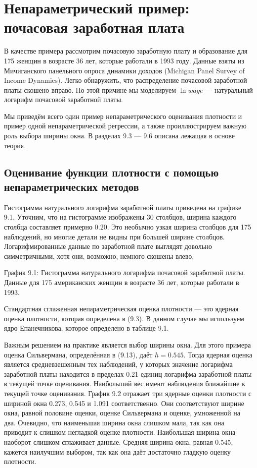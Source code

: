 \section{Непараметрический пример: почасовая заработная плата}

В качестве примера рассмотрим почасовую заработную плату и образование для 175 женщин в возрасте 36 лет, которые работали в 1993 году. Данные взяты из Мичиганского панельного опроса динамики доходов (Michigan Panel Survey of Income Dynamics). Легко обнаружить, что распределение почасовой заработной платы скошено вправо. По этой причине мы моделируем $\ln wage$ --- натуральный логарифм почасовой заработной платы.

Мы приведём всего один пример непараметрического оценивания плотности и пример одной непараметрической регрессии, а также проиллюстрируем важную роль выбора ширины окна. В разделах 9.3 --- 9.6 описана лежащая в основе теория.

\subsection{Оценивание функции плотности с помощью непараметрических методов}

Гистограмма натурального логарифма заработной платы приведена на графике 9.1. Уточним, что на гистограмме изображены 30 столбцов, ширина каждого столбца составляет примерно 0.20. Это необычно узкая ширина столбцов для 175 наблюдений, но многие детали не видны при большей ширине столбцов. Логарифмированные данные по заработной плате выглядят довольно симметричными, хотя они, возможно, немного скошены влево.

\vspace{5cm}

График 9.1: Гистограмма натурального логарифма почасовой заработной платы. Данные для 175 американских женщин в возрасте 36 лет, которые работали в 1993.

Стандартная сглаженная непараметрическая оценка плотности --- это ядерная оценка плотности, которая определена в (9.3). В данном случае мы используем ядро Епанечникова, которое определено в таблице 9.1.

Важным решением на практике является выбор ширины окна. Для этого примера оценка Сильвермана, определённая в (9.13), даёт $h = 0.545$. Тогда ядерная оценка является средневзешенным тех наблюдений, у которых значение логарифма заработной платы находится в пределах 0.21 единиц логарифма заработной платы в текущей точке оценивания. Наибольший вес имеют наблюдения  ближайшие к текущей точке оценивания. График 9.2 отражает три ядерные оценки плотности с шириной окна 0.273, 0.545 и 1.091 соответственно. Они соответствуют ширине окна, равной половине оценки, оценке Сильвермана и оценке, умноженной на два. Очевидно, что наименьшая ширина окна слишком мала, так как она приводит к слишком негладкой оценке плотности. Наибольшая ширина окна наоборот слишком сглаживает данные. Средняя ширина окна, равная 0.545, кажется наилучшим выбором, так как она даёт достаточно гладкую оценку плотности.

